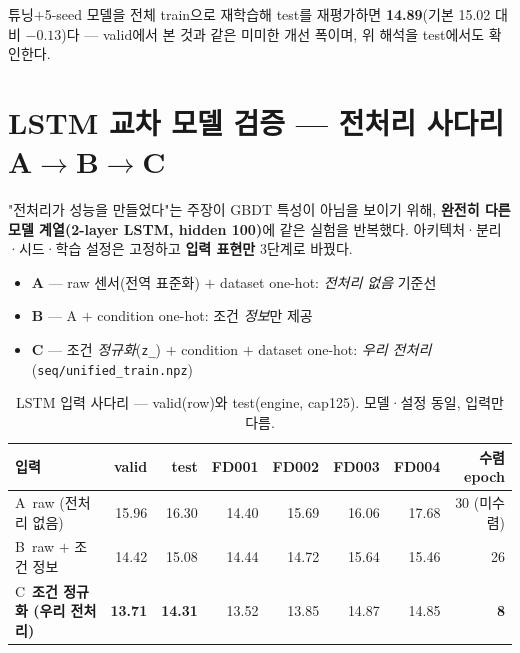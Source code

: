 \documentclass[11pt]{article}
\begin{document}
튜닝$+$5-seed 모델을 전체 train으로 재학습해 test를 재평가하면 \textbf{14.89}(기본 15.02 대비 $-0.13$)다 — valid에서 본 것과 같은 미미한 개선 폭이며, 위 해석을 test에서도 확인한다.

\section{LSTM 교차 모델 검증 — 전처리 사다리 A$\to$B$\to$C}

"전처리가 성능을 만들었다"는 주장이 GBDT 특성이 아님을 보이기 위해,
\textbf{완전히 다른 모델 계열(2-layer LSTM, hidden 100)}에 같은 실험을 반복했다.
아키텍처·분리·시드·학습 설정은 고정하고 \textbf{입력 표현만} 3단계로 바꿨다.

\begin{itemize}[nosep]
  \item \textbf{A} — raw 센서(전역 표준화) $+$ dataset one-hot: \emph{전처리 없음} 기준선
  \item \textbf{B} — A $+$ condition one-hot: 조건 \emph{정보}만 제공
  \item \textbf{C} — 조건 \emph{정규화}(\texttt{z\_}) $+$ condition $+$ dataset one-hot: \emph{우리 전처리} (\texttt{seq/unified\_train.npz})
\end{itemize}

\begin{table}[H]
\centering
\caption{LSTM 입력 사다리 — valid(row)와 test(engine, cap125). 모델·설정 동일, 입력만 다름.}
\label{tab:ladder}
\begin{tabular}{lrrrrrr r}
\toprule
입력 & valid & test & FD001 & FD002 & FD003 & FD004 & 수렴 epoch \\
\midrule
A\ raw (전처리 없음) & 15.96 & 16.30 & 14.40 & 15.69 & 16.06 & 17.68 & 30 (미수렴) \\
B\ raw $+$ 조건 정보 & 14.42 & 15.08 & 14.44 & 14.72 & 15.64 & 15.46 & 26 \\
C\ \textbf{조건 정규화 (우리 전처리)} & \textbf{13.71} & \textbf{14.31} & 13.52 & 13.85 & 14.87 & 14.85 & \textbf{8} \\
\bottomrule
\end{tabular}
\end{table}
\end{document}
